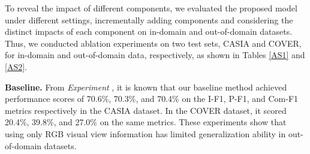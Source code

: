 \begin{minipage}[t]{0.48\textwidth} %
\centering
{}
\renewcommand\arraystretch{1.2}
\label{AS2}
\end{minipage}

To reveal the impact of different components, we evaluated the proposed model under different settings, incrementally adding components and considering the distinct impacts of each component on in-domain and out-of-domain datasets. Thus, we conducted ablation experiments on two test sets, CASIA and COVER, for in-domain and out-of-domain data, respectively, as shown  in Tables \ref{AS1} and \ref{AS2}.

\noindent\textbf{Baseline.}  From \textit{Experiment }, it is known that our baseline method achieved performance scores of 70.6\%, 70.3\%, and 70.4\% on the I-F1, P-F1, and Com-F1 metrics respectively in the CASIA dataset. In the COVER dataset, it scored 20.4\%, 39.8\%, and 27.0\% on the same metrics. These experiments show that using only RGB visual view information has limited generalization ability in out-of-domain datasets.

